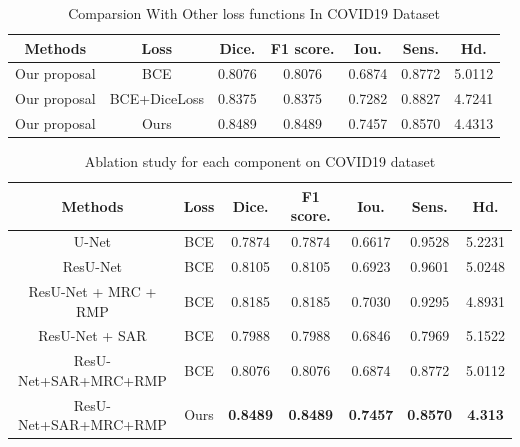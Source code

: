 \documentclass[UTF8]{article} %
\begin{document}
  \begin{table}[H]
    \vspace{-2mm}
    \begin{center}\small
    \caption{Comparsion With Other loss functions In COVID19\cite{covid19} Dataset}
    \label{loss-table}
    \begin{tabular}{ccccccc}
      
    \toprule
    Methods & Loss & Dice. & F1 score. & Iou. & Sens. & Hd.\\
    \midrule
      Our proposal & BCE          & 0.8076 & 0.8076 & 0.6874 & 0.8772 & 5.0112\\
      Our proposal & BCE+DiceLoss & 0.8375 & 0.8375 & 0.7282 & 0.8827 & 4.7241\\
      Our proposal & Ours         & 0.8489 & 0.8489 & 0.7457 & 0.8570 & 4.4313\\
  \bottomrule    
    \end{tabular}
    \end{center}
    \vspace{-4mm}
  \end{table}

  \begin{table}[H]
    \vspace{-2mm}
    \begin{center}\small
    \caption{Ablation study for each component on COVID19 dataset}
    \label{loss-table}
    \begin{tabular}{ccccccc}
      
    \toprule
    Methods & Loss & Dice. & F1 score. & Iou. & Sens. & Hd.\\
    \midrule
      U-Net                & BCE & 0.7874 & 0.7874 & 0.6617 & 0.9528 & 5.2231\\
      ResU-Net             & BCE & 0.8105 & 0.8105 & 0.6923 & 0.9601 & 5.0248\\
      ResU-Net + MRC + RMP & BCE & 0.8185 & 0.8185 & 0.7030 & 0.9295 & 4.8931\\
      ResU-Net + SAR       & BCE & 0.7988 & 0.7988 & 0.6846 & 0.7969 & 5.1522\\  %
      ResU-Net+SAR+MRC+RMP & BCE & 0.8076 & 0.8076 & 0.6874 & 0.8772 & 5.0112\\
      ResU-Net+SAR+MRC+RMP & Ours & \textbf{0.8489} & \textbf{0.8489} & \textbf{0.7457} & \textbf{0.8570} & \textbf{4.313}\\
  \bottomrule    
    \end{tabular}
    \end{center}
    \vspace{-4mm}
  \end{table}
\end{document}
